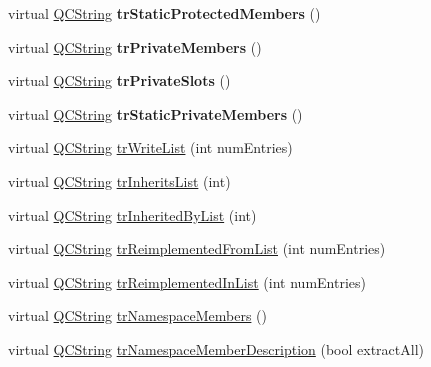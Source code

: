 \begin{DoxyCompactItemize}
\mbox{\label{class_translator_serbian_ad481c06a7937627adc8a95ca051388be}} 
virtual \mbox{\hyperlink{class_q_c_string}{Q\+C\+String}} {\bfseries tr\+Static\+Protected\+Members} ()
\item 
\mbox{\label{class_translator_serbian_aaa8b9fb056a16cfed8aa7ac08ccd1536}} 
virtual \mbox{\hyperlink{class_q_c_string}{Q\+C\+String}} {\bfseries tr\+Private\+Members} ()
\item 
\mbox{\label{class_translator_serbian_aed558ff8f0bbf640002a3b5bde2aef4a}} 
virtual \mbox{\hyperlink{class_q_c_string}{Q\+C\+String}} {\bfseries tr\+Private\+Slots} ()
\item 
\mbox{\label{class_translator_serbian_a1b0cdb1b4943ac3a0a9f4c4974b35ab7}} 
virtual \mbox{\hyperlink{class_q_c_string}{Q\+C\+String}} {\bfseries tr\+Static\+Private\+Members} ()
\item 
virtual \mbox{\hyperlink{class_q_c_string}{Q\+C\+String}} \mbox{\hyperlink{class_translator_serbian_aba929588153054499fe94a62e62b3328}{tr\+Write\+List}} (int num\+Entries)
\item 
virtual \mbox{\hyperlink{class_q_c_string}{Q\+C\+String}} \mbox{\hyperlink{class_translator_serbian_ab27718cda7872ab5e36b0f0fcdc4e2a0}{tr\+Inherits\+List}} (int)
\item 
virtual \mbox{\hyperlink{class_q_c_string}{Q\+C\+String}} \mbox{\hyperlink{class_translator_serbian_ad909c2cc73e8ed088f9b37a3567f5ef6}{tr\+Inherited\+By\+List}} (int)
\item 
virtual \mbox{\hyperlink{class_q_c_string}{Q\+C\+String}} \mbox{\hyperlink{class_translator_serbian_ab7fa5ecfcb8a4046516fd67a44dd89b4}{tr\+Reimplemented\+From\+List}} (int num\+Entries)
\item 
virtual \mbox{\hyperlink{class_q_c_string}{Q\+C\+String}} \mbox{\hyperlink{class_translator_serbian_a035c0fb4d8b00e78e0bda87b342ba7dc}{tr\+Reimplemented\+In\+List}} (int num\+Entries)
\item 
virtual \mbox{\hyperlink{class_q_c_string}{Q\+C\+String}} \mbox{\hyperlink{class_translator_serbian_aed20527aa9f88f29bc5f685db1315a7c}{tr\+Namespace\+Members}} ()
\item 
virtual \mbox{\hyperlink{class_q_c_string}{Q\+C\+String}} \mbox{\hyperlink{class_translator_serbian_a852f7f80f8d735683d22ee514e3ef0fd}{tr\+Namespace\+Member\+Description}} (bool extract\+All)

\end{DoxyCompactItemize}
